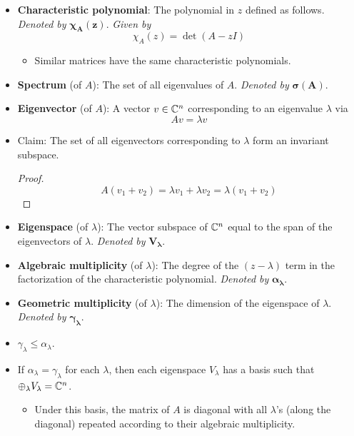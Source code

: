 \documentclass[../notes.tex]{subfiles}
\begin{document}
\begin{itemize}
\begin{itemize}
    \end{itemize}
    \item \textbf{Characteristic polynomial}: The polynomial in $z$ defined as follows. \emph{Denoted by} $\bm{\chi_A(z)}$. \emph{Given by}
    \begin{equation*}
        \chi_A(z) = \det(A-zI)
    \end{equation*}
    \begin{itemize}
        \item Similar matrices have the same characteristic polynomials.
    \end{itemize}
    \item \textbf{Spectrum} (of $A$): The set of all eigenvalues of $A$. \emph{Denoted by} $\bm{\sigma(A)}$.
    \item \textbf{Eigenvector} (of $A$): A vector $v\in\mathbb{C}^n$ corresponding to an eigenvalue $\lambda$ via
    \begin{equation*}
        Av = \lambda v
    \end{equation*}
    \item Claim: The set of all eigenvectors corresponding to $\lambda$ form an invariant subspace.
    \begin{proof}
        \begin{equation*}
            A(v_1+v_2) = \lambda v_1+\lambda v_2
            = \lambda(v_1+v_2)
        \end{equation*}
    \end{proof}
    \item \textbf{Eigenspace} (of $\lambda$): The vector subspace of $\mathbb{C}^n$ equal to the span of the eigenvectors of $\lambda$. \emph{Denoted by} $\bm{V_\lambda}$.
    \item \textbf{Algebraic multiplicity} (of $\lambda$): The degree of the $(z-\lambda)$ term in the factorization of the characteristic polynomial. \emph{Denoted by} $\bm{\alpha_\lambda}$.
    \item \textbf{Geometric multiplicity} (of $\lambda$): The dimension of the eigenspace of $\lambda$. \emph{Denoted by} $\bm{\gamma_\lambda}$.
    \item $\gamma_\lambda\leq\alpha_\lambda$.
    \item If $\alpha_\lambda=\gamma_\lambda$ for each $\lambda$, then each eigenspace $V_\lambda$ has a basis such that $\oplus_\lambda V_\lambda=\mathbb{C}^n$.
    \begin{itemize}
        \item Under this basis, the matrix of $A$ is diagonal with all $\lambda$'s (along the diagonal) repeated according to their algebraic multiplicity.

\end{itemize}
\end{itemize}
\end{document}
